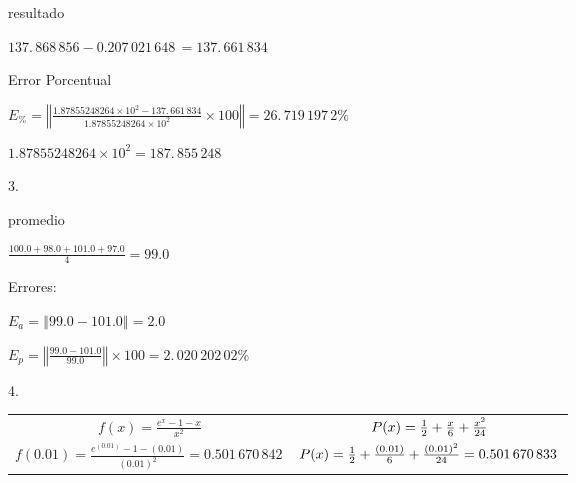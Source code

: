 \documentclass{article}
\begin{document}
resultado

$\allowbreak 137.\,\allowbreak 868\,856-0.207\,021\,648\,=\allowbreak
137.\,\allowbreak 661\,834$

Error Porcentual

$E_{\%}=\left\Vert \frac{1.87855248264\times 10^{2}-137.\,\allowbreak
661\,834}{1.87855248264\times 10^{2}}\times 100\right\Vert =\allowbreak
26.\,\allowbreak 719\,197\,2\%$

$1.87855248264\times 10^{2}=\allowbreak 187.\,\allowbreak 855\,248$

3.

promedio

\bigskip $\frac{100.0+98.0+101.0+97.0}{4}=\allowbreak 99.0$

Errores:

\bigskip $E_{a}=\left\Vert 99.0-101.0\right\Vert =\allowbreak 2.0$

$E_{p}=\left\Vert \frac{99.0-101.0}{99.0}\right\Vert \times 100=\allowbreak
2.\,\allowbreak 020\,202\,02\%$

4.

\begin{tabular}{cc}
$f(x)=\frac{e^{x}-1-x}{x^{2}}$ & $P(x)=\frac{1}{2}+\frac{x}{6}+\frac{x^{2}}{%
24}$ \\ 
$f(0.01)=\frac{e^{(0.01)}-1-(0.01)}{(0.01)^{2}}=\allowbreak
0.501\,670\,842\,\allowbreak $ & $P(x)=\frac{1}{2}+\frac{(0.01)}{6}+\frac{%
(0.01)^{2}}{24}=\allowbreak 0.501\,670\,833\,\allowbreak $%
\end{tabular}%
\newline
\end{document}
